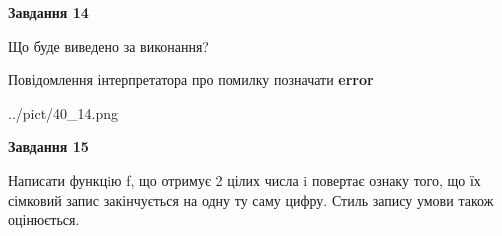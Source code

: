 \documentclass[11pt, ukrainian]{article}
\begin{document}
{\begin {large}
{\begin {center}\textbf{Завдання 14}\end {center}}\par
Що буде виведено за виконання? \par
Повідомлення інтерпретатора про помилку позначати \textbf{error}

\begin{center}
	{../pict/40_14.png}
\end{center}
\newpage

{\begin {center}\textbf{Завдання 15}\end {center}}\par

Написати функцiю f, що отримує 2 цілих числа i повертає ознаку того, що їх сімковий запис закінчується на одну ту саму цифру. Стиль запису умови також оцінюється.\par
\newpage

\end {large}}
\end{document}
